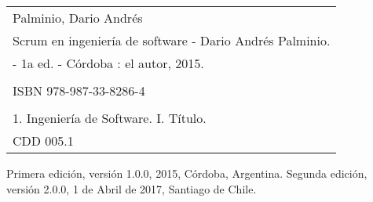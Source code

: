 
\newpage



\begin{table}
\centering
    \begin{tabular}{|l|}
    \hline
    {\small Palminio, Dario Andrés} \\   
    {\small Scrum en ingeniería de software - Dario Andrés Palminio.} \\ 
    {\small - 1a ed. -  Córdoba : el autor, 2015.}
         \\ \\   
         {\small ISBN 978-987-33-8286-4 } \\ \\   
         {\small 1. Ingeniería de Software. I. Título.}  \\   
         {\small CDD 005.1}  \\ \hline
    \end{tabular}
\end{table}


Primera edición, versión 1.0.0, 2015, Córdoba, Argentina.
Segunda edición, versión 2.0.0, 1 de Abril de 2017, Santiago de Chile.


